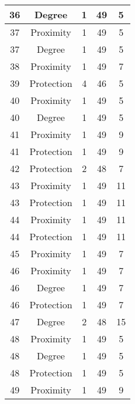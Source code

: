 \documentclass[results.tex]{subfiles}
\begin{document}
\begin{center}
\begin{tabular}{| c || c | c | c | c |}
    \hline
    36 & Degree & 1 & 49 & 5 \\ 
    \hline
    37 & Proximity & 1 & 49 & 5 \\ 
    \hline
    37 & Degree & 1 & 49 & 5 \\ 
    \hline
    38 & Proximity & 1 & 49 & 7 \\ 
    \hline
    39 & Protection & 4 & 46 & 5 \\ 
    \hline
    40 & Proximity & 1 & 49 & 5 \\ 
    \hline
    40 & Degree & 1 & 49 & 5 \\ 
    \hline
    41 & Proximity & 1 & 49 & 9 \\ 
    \hline
    41 & Protection & 1 & 49 & 9 \\ 
    \hline
    42 & Protection & 2 & 48 & 7 \\ 
    \hline
    43 & Proximity & 1 & 49 & 11 \\ 
    \hline
    43 & Protection & 1 & 49 & 11 \\ 
    \hline
    44 & Proximity & 1 & 49 & 11 \\ 
    \hline
    44 & Protection & 1 & 49 & 11 \\ 
    \hline
    45 & Proximity & 1 & 49 & 7 \\ 
    \hline
    46 & Proximity & 1 & 49 & 7 \\ 
    \hline
    46 & Degree & 1 & 49 & 7 \\ 
    \hline
    46 & Protection & 1 & 49 & 7 \\ 
    \hline
    47 & Degree & 2 & 48 & 15 \\ 
    \hline
    48 & Proximity & 1 & 49 & 5 \\ 
    \hline
    48 & Degree & 1 & 49 & 5 \\ 
    \hline
    48 & Protection & 1 & 49 & 5 \\ 
    \hline
    49 & Proximity & 1 & 49 & 9 \\ 
    \hline   \end{tabular}
\end{center}
\end{document}

